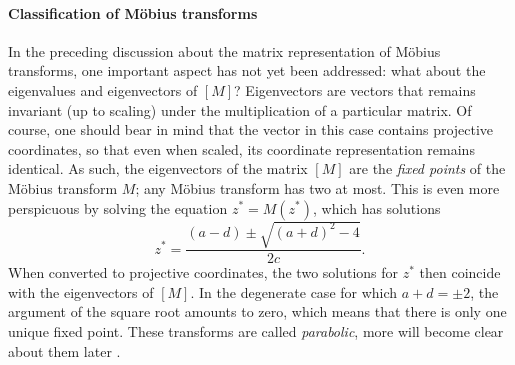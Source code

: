 \paragraph{Classification of Möbius transforms}
In the preceding discussion about the matrix representation of Möbius transforms, one important aspect has not yet been addressed: what about the eigenvalues and eigenvectors of \([M]\)? Eigenvectors are vectors that remains invariant (up to scaling) under the multiplication of a particular matrix. Of course, one should bear in mind that the vector in this case contains projective coordinates, so that even when scaled, its coordinate representation remains identical. As such, the eigenvectors of the matrix \([M]\) are the \emph{fixed points} of the Möbius transform \(M\); any Möbius transform has two at most. This is even more perspicuous by solving the equation \(z^* = M(z^*)\), which has solutions
\[ z^* = \frac{(a - d) \pm \sqrt{(a + d)^2 - 4}}{2c}.\]
When converted to projective coordinates, the two solutions for \(z^*\) then coincide with the eigenvectors of \([M]\). In the degenerate case for which \(a + d = \pm2\), the argument of the square root amounts to zero, which means that there is only one unique fixed point. These transforms are called \emph{parabolic}, more will become clear about them later \cite{Needham1997}.

